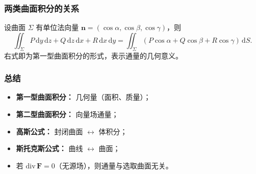 \subsubsection{两类曲面积分的关系}

设曲面 $\Sigma$ 有单位法向量 $\mathbf{n} = (\cos\alpha, \cos\beta, \cos\gamma)$，则
\[
      \iint_{\Sigma} P\,\mathrm{d}y\,\mathrm{d}z + Q\,\mathrm{d}z\,\mathrm{d}x + R\,\mathrm{d}x\,\mathrm{d}y
      = \iint_{\Sigma} (P\cos\alpha + Q\cos\beta + R\cos\gamma)\,\mathrm{d}S.
\]
右式即为第一型曲面积分的形式，表示通量的几何意义。


\subsubsection{总结}

\begin{itemize}
      \item \textbf{第一型曲面积分：} 几何量（面积、质量）；
      \item \textbf{第二型曲面积分：} 向量场通量；
      \item \textbf{高斯公式：} 封闭曲面 $\leftrightarrow$ 体积分；
      \item \textbf{斯托克斯公式：} 曲线 $\leftrightarrow$ 曲面；
      \item 若 $\mathrm{div}\,\mathbf{F}=0$（无源场），则通量与选取曲面无关。
\end{itemize}
